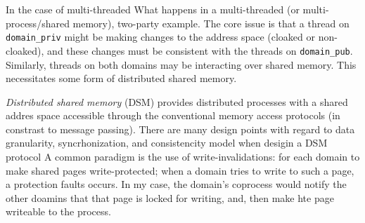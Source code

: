 %
%
%
%
%
%
%


%
In the case of multi-threaded 
What happens in a multi-threaded (or multi-process/shared memory), two-party
example.  
%
The core issue is that a thread on \texttt{domain\_priv} might be making changes to
the address space (cloaked or non-cloaked), and these changes must be
consistent with the threads on \texttt{domain\_pub}.
%
Similarly, threads on both domains may be interacting over shared memory.
%
This necessitates some form of distributed shared memory.


\emph{Distributed shared memory} (DSM) provides distributed processes with a
shared addres space accessible through the conventional memory access protocols
(in constrast to message passing).
%
There are many design points with regard to data granularity, syncrhonization,
and consistencity model when desigin a DSM protocol
%
A common paradigm is the use of  write-invalidations: for each domain to make
shared pages write-protected; when a domain tries to write to such a page, a
protection faults occurs.
%
In my case, the domain's coprocess would notify the other doamins that that
page is locked for writing, and, then make hte page writeable to the process.


